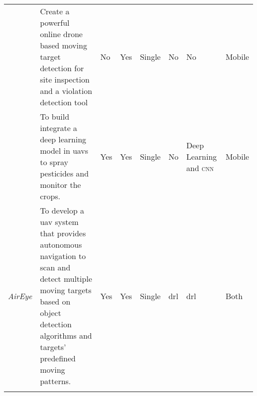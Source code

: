 {\begin{center}
\begin{footnotesize}
\begin{xltabular}{\textwidth}{ p{0.9cm} p{4cm} X X X X p{1.4cm} p{1.4cm} }
            \cite{Wang18} 
                & Create a powerful online drone 
                based moving target detection 
                for site inspection and 
                a violation detection tool 
                    & No 
                        & Yes 
            & Single 
                & No
                    & No
                        	& Mobile  \\ \addlinespace

            \cite{Khan21}
                & To build integrate a deep 
                learning model in \glspl{uav} to spray 
                pesticides and monitor the crops.
                    & Yes 
                        & Yes 
            & Single 
                & No
                	& Deep Learning and \textsc{cnn}     
                        	& Mobile \\ \addlinespace

			\textit{AirEye} 				 
				&To develop a \gls{uav} system that provides autonomous
				navigation to scan and detect multiple moving targets
				based on object detection algorithms and targets' predefined moving 
				patterns.	
					& Yes
						 & Yes 
			& Single 
				& \gls{drl}
					 & \gls{drl} 
					 		& Both \\ \addlinespace
			
            \bottomrule
        \end{xltabular}
    \end{footnotesize}
\end{center}
}

